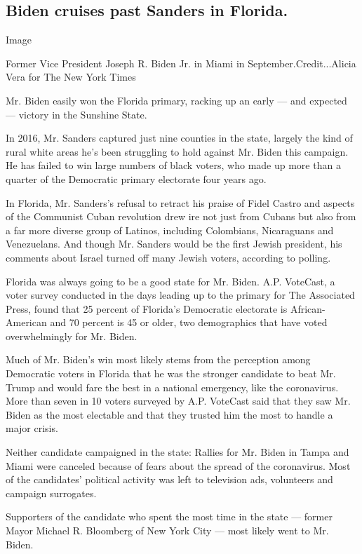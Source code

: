 \hypertarget{biden-cruises-past-sanders-in-florida}{%
\subsection{Biden cruises past Sanders in
Florida.}\label{biden-cruises-past-sanders-in-florida}}

Image

Former Vice President Joseph R. Biden Jr. in Miami in
September.Credit...Alicia Vera for The New York Times

Mr. Biden easily won the Florida primary, racking up an early --- and
expected --- victory in the Sunshine State.

In 2016, Mr. Sanders captured just nine counties in the state, largely
the kind of rural white areas he's been struggling to hold against Mr.
Biden this campaign. He has failed to win large numbers of black voters,
who made up more than a quarter of the Democratic primary electorate
four years ago.

In Florida, Mr. Sanders's refusal to retract his praise of Fidel Castro
and aspects of the Communist Cuban revolution drew ire not just from
Cubans but also from a far more diverse group of Latinos, including
Colombians, Nicaraguans and Venezuelans. And though Mr. Sanders would be
the first Jewish president, his comments about Israel turned off many
Jewish voters, according to polling.

Florida was always going to be a good state for Mr. Biden. A.P.
VoteCast, a voter survey conducted in the days leading up to the primary
for The Associated Press, found that 25 percent of Florida's Democratic
electorate is African-American and 70 percent is 45 or older, two
demographics that have voted overwhelmingly for Mr. Biden.

Much of Mr. Biden's win most likely stems from the perception among
Democratic voters in Florida that he was the stronger candidate to beat
Mr. Trump and would fare the best in a national emergency, like the
coronavirus. More than seven in 10 voters surveyed by A.P. VoteCast said
that they saw Mr. Biden as the most electable and that they trusted him
the most to handle a major crisis.

Neither candidate campaigned in the state: Rallies for Mr. Biden in
Tampa and Miami were canceled because of fears about the spread of the
coronavirus. Most of the candidates' political activity was left to
television ads, volunteers and campaign surrogates.

Supporters of the candidate who spent the most time in the state ---
former Mayor Michael R. Bloomberg of New York City --- most likely went
to Mr. Biden.

